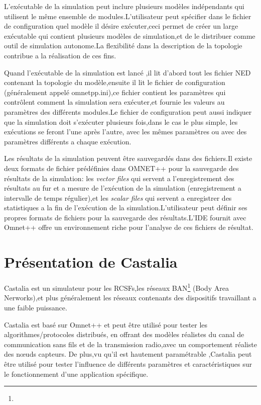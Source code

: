 L'exécutable de la simulation peut inclure plusieurs modèles indépendants qui utilisent le même ensemble de modules.L'utilisateur peut spécifier dans le fichier de configuration quel modèle il désire exécuter,ceci permet de créer un large exécutable qui contient plusieurs modèles de simulation,et de le distribuer comme outil de simulation autonome.La flexibilité dans la description de la topologie contribue a la réalisation de ces fins. 

Quand l'exécutable de la simulation est lancé ,il lit d'abord tout les fichier NED contenant la topologie du modèle,ensuite il lit le fichier de configuration (généralement appelé omnetpp.ini),ce fichier contient les paramètres qui contrôlent comment la simulation sera exécuter,et fournie les valeurs au paramètres des différents modules.Le fichier de configuration peut aussi indiquer que la simulation doit s'exécuter plusieurs fois,dans le cas le plus simple, les exécutions se feront l'une après l'autre, avec les mêmes paramètres  ou avec des paramètres différents a chaque exécution.

Les résultats de la simulation peuvent être sauvegardés dans des fichiers.Il existe deux formats de fichier prédéfinies dans OMNET++ pour la sauvegarde des résultats de la simulation: les \emph{vector files} qui servent a l'enregistrement des résultats au fur et a mesure de l'exécution de la simulation (enregistrement a intervalle de temps régulier),et les \emph{scalar files} qui servent a enregistrer des statistiques a la fin de l'exécution de la simulation.L'utilisateur peut définir ses propres formats de fichiers pour la sauvegarde des résultats.L'IDE fournit avec Omnet++ offre un environnement riche pour l'analyse de ces fichiers de résultat.

\section{Présentation de Castalia}
Castalia est un simulateur pour les RCSFs,les réseaux BAN\footnote{} (Body Area Nerworks),et plus généralement les réseaux contenants des dispositifs travaillant a une faible puissance.

Castalia est basé sur Omnet++ et peut être utilisé pour tester les algorithmes/protocoles  distribués, en offrant des modèles réalistes du canal de communication sans fils et de la transmission radio,avec un comportement réaliste des nœuds capteurs.
De plus,vu qu'il est hautement paramétrable ,Castalia peut être utilisé pour tester l'influence de différents paramètres et caractéristiques sur le fonctionnement d'une application spécifique. 

